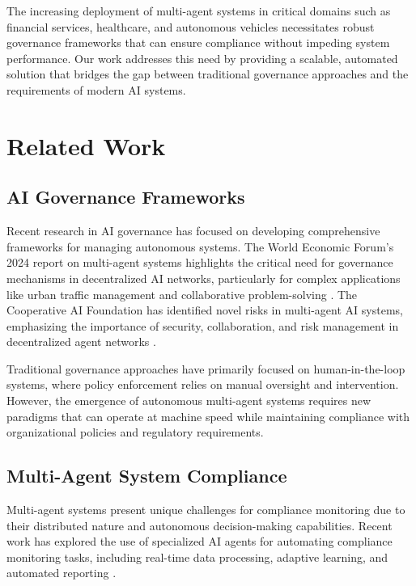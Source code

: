 \documentclass[letterpaper]{article}
\begin{document}
The increasing deployment of multi-agent systems in critical domains such as financial services, healthcare, and autonomous vehicles necessitates robust governance frameworks that can ensure compliance without impeding system performance. Our work addresses this need by providing a scalable, automated solution that bridges the gap between traditional governance approaches and the requirements of modern AI systems.

\section{Related Work}

\subsection{AI Governance Frameworks}

Recent research in AI governance has focused on developing comprehensive frameworks for managing autonomous systems. The World Economic Forum's 2024 report on multi-agent systems highlights the critical need for governance mechanisms in decentralized AI networks, particularly for complex applications like urban traffic management and collaborative problem-solving \cite{wef2024multiagent}. The Cooperative AI Foundation has identified novel risks in multi-agent AI systems, emphasizing the importance of security, collaboration, and risk management in decentralized agent networks \cite{cooperative2024risks}.

Traditional governance approaches have primarily focused on human-in-the-loop systems, where policy enforcement relies on manual oversight and intervention. However, the emergence of autonomous multi-agent systems requires new paradigms that can operate at machine speed while maintaining compliance with organizational policies and regulatory requirements.

\subsection{Multi-Agent System Compliance}

Multi-agent systems present unique challenges for compliance monitoring due to their distributed nature and autonomous decision-making capabilities. Recent work has explored the use of specialized AI agents for automating compliance monitoring tasks, including real-time data processing, adaptive learning, and automated reporting \cite{multiagent2024compliance}.
\end{document}
